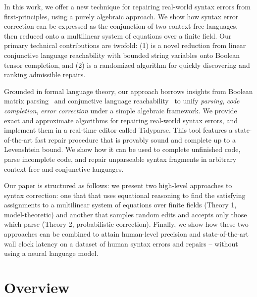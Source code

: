 \documentclass[sigplan,review,anonymous,acmsmall]{acmart}\settopmatter{printfolios=false,printccs=false,printacmref=false}
\begin{document}
In this work, we offer a new technique for repairing real-world syntax errors from first-principles, using a purely algebraic approach. We show how syntax error correction can be expressed as the conjunction of two context-free languages, then reduced onto a multilinear system of equations over a finite field. Our primary technical contributions are twofold: (1) is a novel reduction from linear conjunctive language reachability with bounded string variables onto Boolean tensor completion, and (2) is a randomized algorithm for quickly discovering and ranking admissible repairs.

Grounded in formal language theory, our approach borrows insights from Boolean matrix parsing~\cite{valiant1975general} and conjunctive language reachability~\cite{zhang2017context} to unify \textit{parsing}, \textit{code completion}, \textit{error correction} under a simple algebraic framework. We provide exact and approximate algorithms for repairing real-world syntax errors, and implement them in a real-time editor called Tidyparse. This tool features a state-of-the-art fast repair procedure that is provably sound and complete up to a Levenshtein bound. We show how it can be used to complete unfinished code, parse incomplete code, and repair unparseable syntax fragments in arbitrary context-free and conjunctive languages.

Our paper is structured as follows: we present two high-level approaches to syntax correction: one that that uses equational reasoning to find the satisfying assignments to a multilinear system of equations over finite fields (Theory 1, model-theoretic) and another that samples random edits and accepts only those which parse (Theory 2, probabilistic correction). Finally, we show how these two approaches can be combined to attain human-level precision and state-of-the-art wall clock latency on a dataset of human syntax errors and repairs -- without using a neural language model.

\section{Overview}
\end{document}
